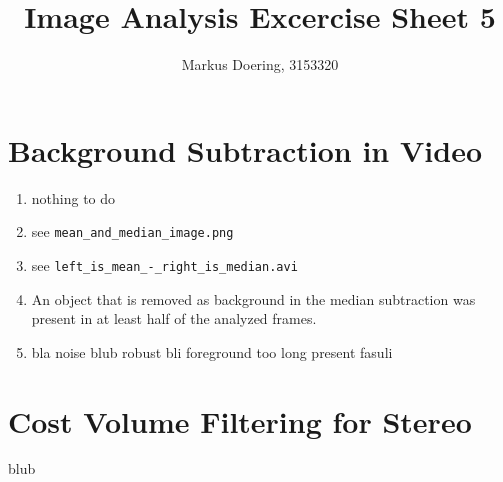 \documentclass[11pt,a4paper]{scrartcl}
\begin{document}
\title{Image Analysis Excercise Sheet 5}
\author{Markus Doering, 3153320}
\maketitle

\section{Background Subtraction in Video}
\begin{enumerate}
 \item nothing to do
 \item see \lstinline$mean_and_median_image.png$ %
 \item see \lstinline$left_is_mean_-_right_is_median.avi$
 \item An object that is removed as background in the median subtraction was present in at least half of the analyzed frames. 
 \item bla noise blub robust bli foreground too long present fasuli
\end{enumerate}

\section{Cost Volume Filtering for Stereo}
blub

\newpage
\appendix

\newpage

\end{document}
